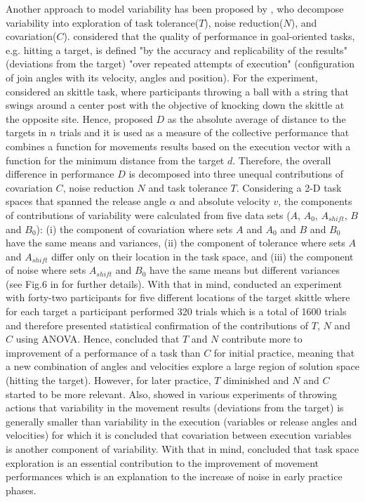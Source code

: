 Another approach to model variability has been proposed by \cite{muller2004},
who decompose variability into exploration of 
task tolerance($T$), noise reduction($N$), and covariation($C$).
\citealt[p. 229]{muller2004} considered that the quality of performance in 
goal-oriented tasks, 
e.g. hitting a target, is defined "by the accuracy and replicability of the 
results" (deviations from the target) "over repeated attempts of execution" 
(configuration of join angles with its velocity, angles and position). 
For the experiment, \cite{muller2004} considered an skittle task, 
where participants throwing a ball with a string that swings around 
a center post with the objective of knocking down the skittle at the opposite site.
Hence, \cite{muller2004} proposed $D$ as the absolute average of distance to
the targets in $n$ trials and it is used as a measure of the collective performance 
that combines a function for movements results based on the execution vector 
with a function for the minimum distance from the target $d$.
Therefore, the overall difference in performance $D$ is decomposed
into three unequal contributions of covariation $C$, 
noise reduction $N$ and task tolerance $T$.
Considering a 2-D task spaces that spanned the release angle $\alpha$
and absolute velocity $v$, the components of contributions of
variability were calculated from five data sets ($A$, $A_0$, $A_{shift}$, $B$ and $B_0$):
(i) the component of covariation where sets $A$ and $A_0$ and $B$ and $B_0$ 
have the same means and variances,
(ii) the component of tolerance where sets $A$ and $A_{shift}$ differ only on
their location in the task space, and 
(iii) the component of noise where sets $A_{shift}$ and $B_0$ have the same
means but different variances (see Fig.6 in \cite{muller2004} for further details).
With that in mind, \cite{muller2004} conducted an experiment with forty-two participants 
for five different locations of the target skittle where for each target a participant 
performed 320 trials which is a total of 1600 trials and therefore presented 
statistical confirmation of the contributions of $T$, $N$ and $C$ using ANOVA.
Hence, \cite{muller2004} concluded that $T$ and $N$ contribute more to improvement of a 
performance of a task than $C$ for initial practice, 
meaning that a new combination of angles and velocities explore a 
large region of solution space (hitting the target).
However, for later practice, $T$ diminished  and $N$ and $C$ started to 
be more relevant.
Also, \cite{muller2004} showed in various experiments of throwing actions
that variability in the movement results (deviations from the target) 
is generally smaller than variability in the execution
(variables or release angles and velocities) for which 
it is concluded that covariation between execution variables
is another component of variability.
With that in mind, \cite{muller2004} concluded that task space exploration 
is an essential  contribution to the improvement of movement performances
which is an explanation to the increase of noise in early practice phases.


